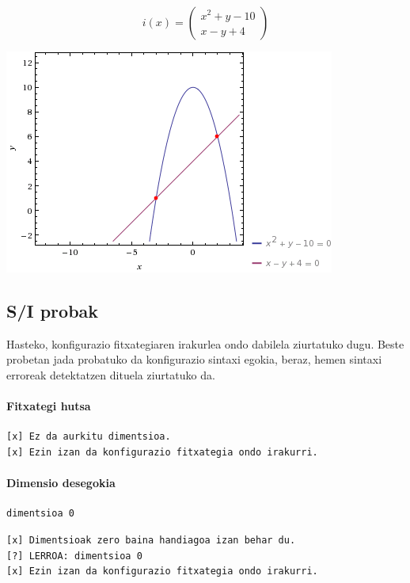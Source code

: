 \documentclass[10pt,a4paper,basque]{article}
\begin{document}
$$i(x) = \left(
\begin{array}{c}
x^2 + y - 10\\
x - y + 4
\end{array}
\right)$$

\begin{center}
\includegraphics[scale=0.5]{plot_ix.png}
\end{center}

\subsection{S/I probak}

Hasteko, konfigurazio fitxategiaren irakurlea ondo dabilela ziurtatuko dugu. Beste probetan jada probatuko da konfigurazio sintaxi egokia, beraz, hemen sintaxi erroreak detektatzen dituela ziurtatuko da.

\paragraph{Fitxategi hutsa}

\begin{lstlisting}
[x] Ez da aurkitu dimentsioa.
[x] Ezin izan da konfigurazio fitxategia ondo irakurri.
\end{lstlisting}

\paragraph{Dimensio desegokia}

\begin{lstlisting}
dimentsioa 0
\end{lstlisting}

\begin{lstlisting}
[x] Dimentsioak zero baina handiagoa izan behar du.
[?] LERROA: dimentsioa 0
[x] Ezin izan da konfigurazio fitxategia ondo irakurri.
\end{lstlisting}
\end{document}
